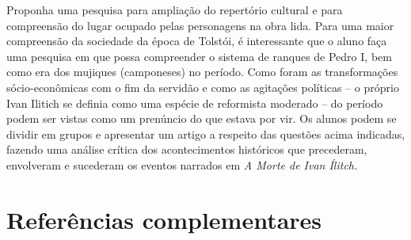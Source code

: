 \documentclass[12pt]{extarticle}
\begin{document}
\begin{comment}
\begin{quote}
O campo das práticas de estudo e pesquisa mantém destaque para os
gêneros e habilidades envolvidos na leitura/escuta e produção de textos
de diferentes áreas do conhecimento e para as habilidades e
procedimentos envolvidos no estudo. Ganham realce também as habilidades
relacionadas à análise, síntese, reflexão, problematização e pesquisa:
estabelecimento de recorte da questão ou problema; seleção de
informações; estabelecimento das condições de coleta de dados para a
realização de levantamentos; realização de pesquisas de diferentes
tipos; tratamento dos dados e informações; e formas de uso e
socialização dos resultados e análises.

Além de fazer uso competente da língua e das outras semioses, os
estudantes devem ter uma atitude investigativa e criativa em relação a
elas e compreender princípios e procedimentos metodológicos que orientam
a produção do conhecimento sobre a língua e as linguagens e a formulação
de regras. (\textsc{bncc}, p. 495-496)
\end{quote}
\end{comment}

Proponha uma pesquisa para ampliação do repertório cultural e para
compreensão do lugar ocupado pelas personagens na obra lida. Para uma
maior compreensão da sociedade da época de Tolstói, é interessante que
o aluno faça uma pesquisa em que possa compreender o sistema de
ranques de Pedro I, bem como era dos mujiques (camponeses) no período.
Como foram as transformações sócio-econômicas com o fim da servidão e
como as agitações políticas -- o próprio Ivan Ilitich se definia como
uma espécie de reformista moderado -- do período podem ser vistas como
um prenúncio do que estava por vir. Os alunos podem se dividir em
grupos e apresentar um artigo a respeito das questões acima indicadas,
fazendo uma análise crítica dos acontecimentos históricos que
precederam, envolveram e sucederam os eventos narrados em \emph{A
Morte de Ivan Ílitch.}






\section{Referências complementares}
\end{document}
